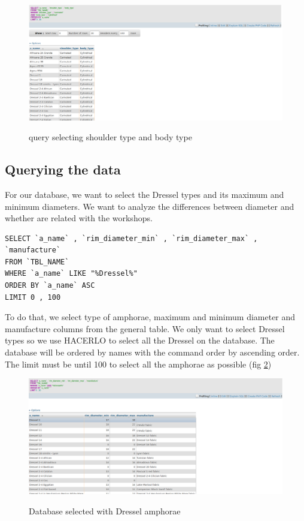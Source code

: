 \documentclass[10pt,a4paper]{article}
\begin{document}
\begin{figure}[hdp]
\centering
\includegraphics[scale=0.30]{query4.png}
\label{query4}
\caption{query selecting shoulder type and body type}
\end{figure} 


\subsection{Querying the data}

For our database, we want to select the Dressel types and its maximum and minimum diameters. We want to analyze the differences between diameter and whether are related with the workshops. 

\begin{verbatim}
SELECT `a_name` , `rim_diameter_min` , `rim_diameter_max` , `manufacture`
FROM `TBL_NAME`
WHERE `a_name` LIKE "%Dressel%"
ORDER BY `a_name` ASC
LIMIT 0 , 100
\end{verbatim}

To do that, we select type of amphorae, maximum and minimum diameter and manufacture columns from the general table. We only want to select Dressel types so we use HACERLO to select all the Dressel on the database. The database will be ordered by names with the command order by ascending order. The limit must be until 100 to select all the amphorae as possible (fig \ref{query5})

\begin{figure}[hdp]
\centering
\includegraphics[scale=0.30]{query5.png}
\label{query5}
\caption{Database selected with Dressel amphorae}
\end{figure} 
\end{document}
